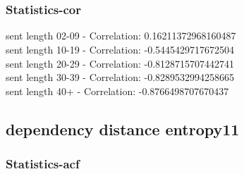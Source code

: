 \documentclass{article}%
\begin{document}
\begin{figure}[ht]%
\centering%
\setlength{\abovecaptionskip}{-35pt}%
%
%
\\%
%
%
\\%
%
\end{figure}

%
\newpage%
\subsubsection{Statistics{-}cor}%
\label{ssubsec:Statistics{-}cor}%
\noindent%
sent length 02-09 - Correlation: 0.16211372968160487\\%
sent length 10-19 - Correlation: -0.5445429717672504\\%
sent length 20-29 - Correlation: -0.8128715707442741\\%
sent length 30-39 - Correlation: -0.8289532994258665\\%
sent length 40+ - Correlation: -0.8766498707670437\\

%
\newpage

%
\subsection{dependency distance entropy11}%
\label{subsec:dependencydistanceentropy11}%
\subsubsection{Statistics{-}acf}%
\label{ssubsec:Statistics{-}acf}%
\end{document}
